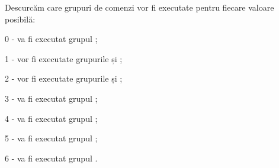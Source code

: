 Descurcăm care grupuri de comenzi vor fi executate pentru fiecare valoare posibilă:
\begin{icItems}
	\item 0 - va fi executat grupul ;
	\item 1 - vor fi executate grupurile  și ;
	\item 2 - vor fi executate grupurile  și ;
	\item 3 - va fi executat grupul ;
	\item 4 - va fi executat grupul ;
	\item 5 - va fi executat grupul ;
	\item 6 - va fi executat grupul .
\end{icItems}


